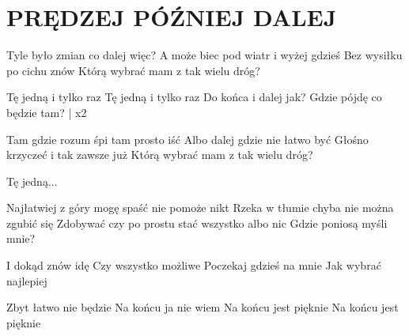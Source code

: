 \documentclass[../../../songbook.tex]{subfiles}
\begin{document}
\TabPositions{8cm} %
\section*{PRĘDZEJ PÓŹNIEJ DALEJ}
{}
\vspace{0.5cm}
Tyle było zmian co dalej więc?		  \newline
A może biec pod wiatr i wyżej gdzieś		 \newline		
Bez wysiłku po cichu znów					 \newline
Którą wybrać mam z tak wielu dróg?			 \newline	

\-\hspace{1cm} Tę jedną i tylko raz		 \newline
\-\hspace{1cm} Tę jedną i tylko raz				 \newline
\-\hspace{1cm} Do końca i dalej jak?		 \newline		
\-\hspace{1cm} Gdzie pójdę co będzie tam?	 | x2\newline

Tam gdzie rozum śpi tam prosto iść			 \newline
Albo dalej gdzie nie łatwo być				 \newline 
Głośno krzyczeć i tak zawsze już		 \newline		
Którą wybrać mam z tak wielu dróg?			 \newline	

\-\hspace{1cm} Tę jedną...			 \newline

Najłatwiej z góry mogę spaść nie pomoże nikt 	  \newline
Rzeka w tłumie chyba nie można zgubić się 				 \newline
Zdobywać czy po prostu stać wszystko albo nic 			 \newline
Gdzie poniosą myśli mnie? 						 \newline

\-\hspace{1cm} I dokąd znów idę 		 \newline
\-\hspace{1cm} Czy wszystko możliwe				 \newline
\-\hspace{1cm} Poczekaj gdzieś na mnie			 \newline
\-\hspace{1cm} Jak wybrać najlepiej			 \newline	 

\-\hspace{1cm} Zbyt łatwo nie będzie	 \newline
\-\hspace{1cm} Na końcu ja nie wiem				 \newline
\-\hspace{1cm} Na końcu jest pięknie			 \newline	
\-\hspace{1cm} Na końcu jest pięknie		 \newline	
\end{document}
